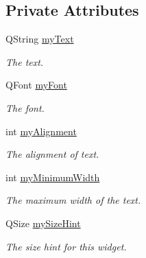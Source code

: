 \subsection*{Private Attributes}
\begin{DoxyCompactItemize}
\item 
\hypertarget{class_u_i_1_1_text_pane_a50c18ff89331d84ec77687a46d2dc141}{Q\-String \hyperlink{class_u_i_1_1_text_pane_a50c18ff89331d84ec77687a46d2dc141}{my\-Text}}\label{class_u_i_1_1_text_pane_a50c18ff89331d84ec77687a46d2dc141}

\begin{DoxyCompactList}\small\item\em The text. \end{DoxyCompactList}\item 
\hypertarget{class_u_i_1_1_text_pane_a353cbd858a1db55e9766a74332a6b02d}{Q\-Font \hyperlink{class_u_i_1_1_text_pane_a353cbd858a1db55e9766a74332a6b02d}{my\-Font}}\label{class_u_i_1_1_text_pane_a353cbd858a1db55e9766a74332a6b02d}

\begin{DoxyCompactList}\small\item\em The font. \end{DoxyCompactList}\item 
\hypertarget{class_u_i_1_1_text_pane_af9f114d4733e7a49ef4122970b449139}{int \hyperlink{class_u_i_1_1_text_pane_af9f114d4733e7a49ef4122970b449139}{my\-Alignment}}\label{class_u_i_1_1_text_pane_af9f114d4733e7a49ef4122970b449139}

\begin{DoxyCompactList}\small\item\em The alignment of text. \end{DoxyCompactList}\item 
\hypertarget{class_u_i_1_1_text_pane_a241da48835c01d404d7f2e29fbcf6a90}{int \hyperlink{class_u_i_1_1_text_pane_a241da48835c01d404d7f2e29fbcf6a90}{my\-Minimum\-Width}}\label{class_u_i_1_1_text_pane_a241da48835c01d404d7f2e29fbcf6a90}

\begin{DoxyCompactList}\small\item\em The maximum width of the text. \end{DoxyCompactList}\item 
\hypertarget{class_u_i_1_1_text_pane_a4d34e87d2ff871eb2210f1684430f35f}{Q\-Size \hyperlink{class_u_i_1_1_text_pane_a4d34e87d2ff871eb2210f1684430f35f}{my\-Size\-Hint}}\label{class_u_i_1_1_text_pane_a4d34e87d2ff871eb2210f1684430f35f}

\begin{DoxyCompactList}\small\item\em The size hint for this widget. \end{DoxyCompactList}\end{DoxyCompactItemize}


